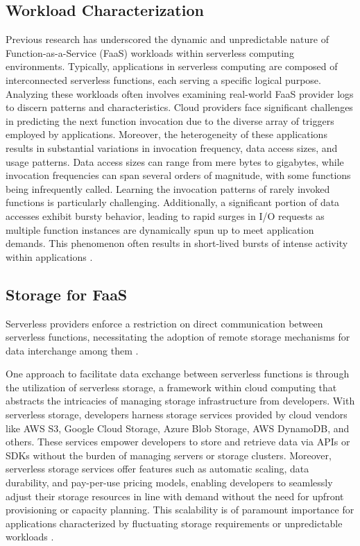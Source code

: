 \subsection{Workload Characterization}
Previous research has underscored the dynamic and unpredictable nature of Function-as-a-Service (FaaS) workloads within serverless computing environments. Typically, applications in serverless computing are composed of interconnected serverless functions, each serving a specific logical purpose. Analyzing these workloads often involves examining real-world FaaS provider logs to discern patterns and characteristics. Cloud providers face significant challenges in predicting the next function invocation due to the diverse array of triggers employed by applications. Moreover, the heterogeneity of these applications results in substantial variations in invocation frequency, data access sizes, and usage patterns. Data access sizes can range from mere bytes to gigabytes, while invocation frequencies can span several orders of magnitude, with some functions being infrequently called. Learning the invocation patterns of rarely invoked functions is particularly challenging. Additionally, a significant portion of data accesses exhibit bursty behavior, leading to rapid surges in I/O requests as multiple function instances are dynamically spun up to meet application demands. This phenomenon often results in short-lived bursts of intense activity within applications \cite{shahrad2020serverless,romero2021faat,klimovic2018pocket}.

\subsection{Storage for FaaS}

Serverless providers enforce a restriction on direct communication between serverless functions, necessitating the adoption of remote storage mechanisms for data interchange among them \cite{jonas2019cloud,klimovic2018pocket,romero2021faat}.

One approach to facilitate data exchange between serverless functions is through the utilization of serverless storage, a framework within cloud computing that abstracts the intricacies of managing storage infrastructure from developers. With serverless storage, developers harness storage services provided by cloud vendors like AWS S3, Google Cloud Storage, Azure Blob Storage, AWS DynamoDB, and others. These services empower developers to store and retrieve data via APIs or SDKs without the burden of managing servers or storage clusters. Moreover, serverless storage services offer features such as automatic scaling, data durability, and pay-per-use pricing models, enabling developers to seamlessly adjust their storage resources in line with demand without the need for upfront provisioning or capacity planning. This scalability is of paramount importance for applications characterized by fluctuating storage requirements or unpredictable workloads  \cite{CloudObj90:online,AmazonDy45:online,DeCandia2007,AzureBlo83:online,CloudSto52:online,Datastor50:online,AzureCos63:online}.

